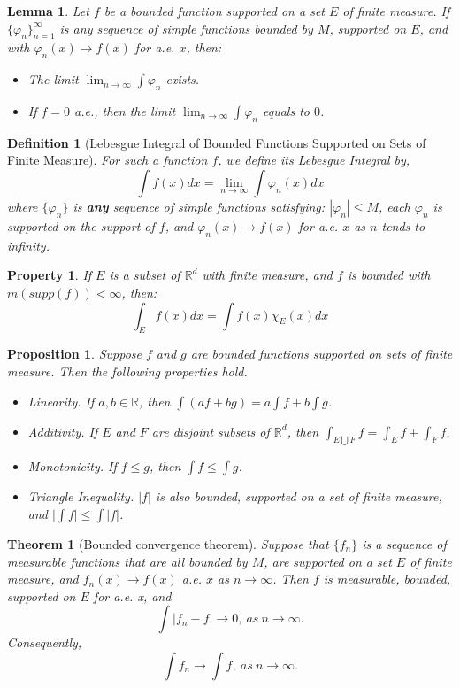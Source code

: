 \documentclass{report}
\theoremstyle{upthm}
\newtheorem{thm}{Theorem}
\newtheorem{defn}{Definition}
\newtheorem{lemma}{Lemma}
\newtheorem{prop}{Proposition}
\newtheorem{property}{Property}
\newcommand{\reals}{\mathbb{R}}
\newcommand{\set}[1]{\big\lbrace #1 \big\rbrace}
\newcommand{\union}{\bigcup}
\newcommand{\vl}{\Big|}
\begin{document}
\begin{lemma}
	Let $f$ be a bounded function supported on a set $E$ of finite measure. If $\set{\varphi_n}_{n=1}^\infty$ is any sequence of simple functions bounded by $M$, supported on $E$, and with $ \varphi_n(x) \rightarrow f(x)$ for a.e. $x$, then:
	\begin{itemize}
		\item The limit $\lim_{n \rightarrow \infty} \int \varphi_n$ exists.
		\item If $f = 0$ a.e., then the limit $\lim_{n \rightarrow \infty} \int \varphi_n$ equals to $0$.
	\end{itemize}
\end{lemma}

\begin{defn}[Lebesgue Integral of Bounded Functions Supported on Sets of Finite Measure]
For such a function $f$, we define its Lebesgue Integral by,
$$ \int f(x) dx = \lim_{n \rightarrow \infty} \int \varphi_n(x) dx $$
where $\set{\varphi_n}$ is {\bf any} sequence of simple functions satisfying: $| \varphi_n | \leq M$, each $\varphi_n$ is supported on the support of $f$, and $\varphi_n(x) \rightarrow f(x)$ for a.e. $x$ as $n$ tends to infinity.  
\end{defn}

\begin{property}
	If $E$ is a subset of $\reals^d$ with finite measure, and $f$ is bounded with $m(supp(f)) < \infty$, then:
	$$ \int_E f(x) dx = \int f(x) \chi_E(x) dx $$
\end{property}

\begin{prop}
	Suppose $f$ and $g$ are bounded functions supported on sets of finite measure. Then the following properties hold. 
	\begin{itemize}
		\item Linearity. If $a, b \in \reals$, then $\int (af + bg) = a \int f + b \int g$.
		\item Additivity. If $E$ and $F$ are disjoint subsets of $\reals^d$, then $\int_{E \union F} f = \int_E f + \int_F f$.
		\item Monotonicity. If $f \leq g$, then $\int f \leq \int g$.
		\item Triangle Inequality. $|f|$ is also bounded, supported on a set of finite
		measure, and $\vl \int f \vl \leq \int |f|$.
	\end{itemize}
\end{prop}

\begin{thm}[Bounded convergence theorem]
Suppose that $\set{f_n}$ is a sequence of measurable functions that are all bounded by $M$, are supported on a set $E$ of finite measure, and $f_n(x) \rightarrow f(x)$ a.e. $x$ as $n \rightarrow \infty$. Then $f$ is measurable, bounded, supported on $E$ for a.e. x, and
$$ \int |f_n - f| \rightarrow 0,\ as\ n\rightarrow \infty. $$
Consequently,
$$ \int f_n \rightarrow \int f,\ as\ n \rightarrow \infty. $$	
\end{thm}
\end{document}
